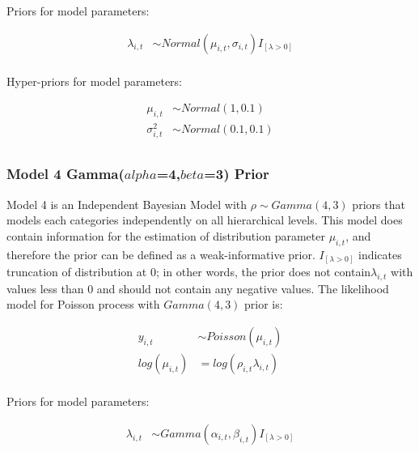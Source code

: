 Priors for model parameters:

\begin{equation*} \label{Poissonm3b}
\begin{aligned}
\lambda_{i,t} & \sim Normal(\mu_{i,t},\sigma_{i,t}) I_{[\lambda>0]}\\
\end{aligned}
\end{equation*}

Hyper-priors for model parameters:

\begin{equation*} \label{Poissonm3c}
\begin{aligned}
\mu_{i,t} & \sim Normal(1,0.1)\\
\sigma^2_{i,t} &\sim Normal(0.1,0.1)\\
\end{aligned}
\end{equation*}

\subsubsection{Model 4 Gamma($alpha$=4,$beta$=3) Prior}

Model 4 is an Independent Bayesian Model with $\rho \sim Gamma(4, 3)$ priors that models each categories independently on all hierarchical levels. This model does contain information for the estimation of distribution parameter $\mu_{i,t}$, and therefore the prior can be defined as a weak-informative prior. $I_{[\lambda>0]}$ indicates truncation of distribution at 0; in other words, the prior does not contain$\lambda_{i,t}$ with values less than 0 and should not contain any negative values. The likelihood model for Poisson process with  $Gamma(4, 3)$ prior is:

\begin{equation*} \label{Poissonm4a}
\begin{aligned}
y_{i,t} & \sim Poisson(\mu_{i,t}) \\  
log(\mu_{i,t}) & = log(\rho_{i,t}\lambda_{i,t}) \\
\end{aligned}
\end{equation*}

Priors for model parameters:

\begin{equation*} \label{Poissonm4b}
\begin{aligned}
\lambda_{i,t} & \sim Gamma(\alpha_{i,t},\beta_{i,t}) I_{[\lambda>0]}\\
\end{aligned}
\end{equation*}

